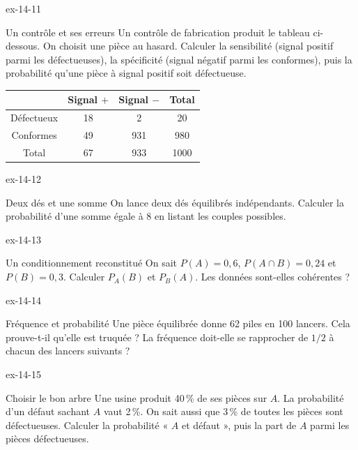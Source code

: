 \clearpage{}
\begin{blocLivre}{ex-14-11}
\begin{exercice}[3]{Un contrôle et ses erreurs}
Un contrôle de fabrication produit le tableau ci-dessous. On choisit une pièce au hasard. Calculer la sensibilité (signal positif parmi les défectueuses), la spécificité (signal négatif parmi les conformes), puis la probabilité qu’une pièce à signal positif soit défectueuse.\begin{center}\renewcommand{\arraystretch}{1.35}\begin{tabular}{c|ccc}\toprule
 & Signal $+$ & Signal $-$ & Total\\\midrule
Défectueux & 18 & 2 & 20\\
Conformes & 49 & 931 & 980\\
Total & 67 & 933 & 1000\\
\bottomrule\end{tabular}\end{center}
\end{exercice}
\end{blocLivre}
\begin{blocLivre}{ex-14-12}
\begin{exercice}[3]{Deux dés et une somme}
On lance deux dés équilibrés indépendants. Calculer la probabilité d’une somme égale à 8 en listant les couples possibles.
\label{fig-ex-14-12}
\end{exercice}
\end{blocLivre}
\begin{blocLivre}{ex-14-13}
\begin{exercice}[3]{Un conditionnement reconstitué}
On sait $P(A)=0{,}6$, $P(A\cap B)=0{,}24$ et $P(B)=0{,}3$. Calculer $P_A(B)$ et $P_B(A)$. Les données sont-elles cohérentes ?
\end{exercice}
\end{blocLivre}
\begin{blocLivre}{ex-14-14}
\begin{exercice}[3]{Fréquence et probabilité}
Une pièce équilibrée donne 62 piles en 100 lancers. Cela prouve-t-il qu’elle est truquée ? La fréquence doit-elle se rapprocher de $1/2$ à chacun des lancers suivants ?
\end{exercice}
\end{blocLivre}
\begin{blocLivre}{ex-14-15}
\begin{exercice}[3]{Choisir le bon arbre}
Une usine produit 40\,\% de ses pièces sur $A$. La probabilité d’un défaut sachant $A$ vaut 2\,\%. On sait aussi que 3\,\% de toutes les pièces sont défectueuses. Calculer la probabilité « $A$ et défaut », puis la part de $A$ parmi les pièces défectueuses.
\label{fig-ex-14-15}
\end{exercice}
\end{blocLivre}

\clearpage
